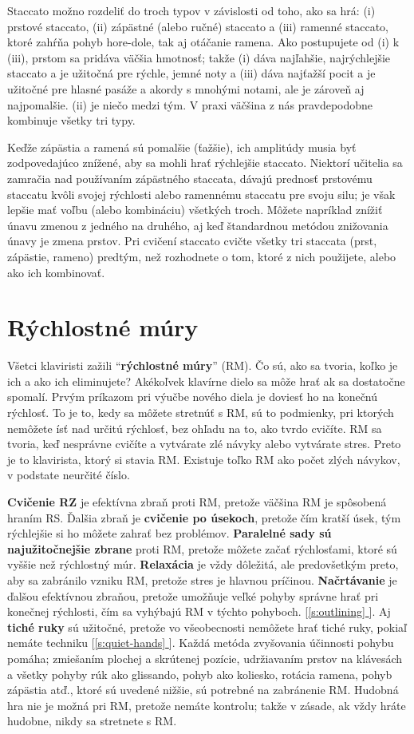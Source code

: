 \documentclass[11pt,a4paper]{book}
\newcommand*{\fullref}[1]{\hyperref[{#1}]{\ref*{#1} \nameref*{#1}}} %
\newcommand*{\fullrefp}[1]{[\fullref{#1}]} %
\begin{document}
Staccato možno rozdeliť do troch typov v závislosti od toho, ako sa hrá: (i) prstové staccato, (ii) zápästné (alebo ručné) staccato a (iii) ramenné staccato, ktoré zahŕňa pohyb hore-dole, tak aj otáčanie ramena. Ako postupujete od (i) k (iii), prstom sa pridáva väčšia hmotnosť; takže (i) dáva najľahšie, najrýchlejšie staccato a je užitočná pre rýchle, jemné noty a (iii) dáva najťažší pocit a je užitočné pre hlasné pasáže a akordy s mnohými notami, ale je zároveň aj najpomalšie. (ii) je niečo medzi tým. V praxi väčšina z nás pravdepodobne kombinuje všetky tri typy.

Keďže zápästia a ramená sú pomalšie (ťažšie), ich amplitúdy musia byť zodpovedajúco znížené, aby sa mohli hrať rýchlejšie staccato. Niektorí učitelia sa zamračia nad používaním zápästného staccata, dávajú prednosť prstovému staccatu kvôli svojej rýchlosti alebo ramennému staccatu pre svoju silu; je však lepšie mať voľbu (alebo kombináciu) všetkých troch. Môžete napríklad znížiť únavu zmenou z jedného na druhého, aj keď štandardnou metódou znižovania únavy je zmena prstov. Pri cvičení staccato cvičte všetky tri staccata (prst, zápästie, rameno) predtým, než rozhodnete o tom, ktoré z nich použijete, alebo ako ich kombinovať.

\section{Rýchlostné múry}\label{s:speed-walls}
Všetci klaviristi zažili “\textbf{rýchlostné múry}” (RM). Čo sú, ako sa tvoria, koľko je ich a ako ich eliminujete? Akékoľvek klavírne dielo sa môže hrať ak sa dostatočne spomalí. Prvým príkazom pri výučbe nového diela je doviesť ho na konečnú rýchlosť. To je to, kedy sa môžete stretnúť s RM, sú to podmienky, pri ktorých nemôžete ísť nad určitú rýchlosť, bez ohľadu na to, ako tvrdo cvičíte. RM sa tvoria, keď nesprávne cvičíte a vytvárate zlé návyky alebo vytvárate stres. Preto je to klavirista, ktorý si stavia RM. Existuje toľko RM ako počet zlých návykov, v podstate neurčité číslo.

\textbf{Cvičenie RZ} je efektívna zbraň proti RM, pretože väčšina RM je spôsobená hraním RS. Ďalšia zbraň je \textbf{cvičenie po úsekoch}, pretože čím kratší úsek, tým rýchlejšie si ho môžete zahrať bez problémov. \textbf{Paralelné sady sú najužitočnejšie zbrane} proti RM, pretože môžete začať rýchlosťami, ktoré sú vyššie než rýchlostný múr. \textbf{Relaxácia} je vždy dôležitá, ale predovšetkým preto, aby sa zabránilo vzniku RM, pretože stres je hlavnou príčinou. \textbf{Načrtávanie} je ďalšou efektívnou zbraňou, pretože umožňuje veľké pohyby správne hrať pri konečnej rýchlosti, čím sa vyhýbajú RM v týchto pohyboch. \fullrefp{s:outlining}. Aj \textbf{tiché ruky} sú užitočné, pretože vo všeobecnosti nemôžete hrať tiché ruky, pokiaľ nemáte techniku ​\fullrefp{s:quiet-hands}. Každá metóda zvyšovania účinnosti pohybu pomáha; zmiešaním plochej a skrútenej pozície, udržiavaním prstov na klávesách a všetky pohyby rúk ako glissando, pohyb ako koliesko, rotácia ramena, pohyb zápästia atď., ktoré sú uvedené nižšie, sú potrebné na zabránenie RM. Hudobná hra nie je možná pri RM, pretože nemáte kontrolu; takže v zásade, ak vždy hráte hudobne, nikdy sa stretnete s RM.
\end{document}
